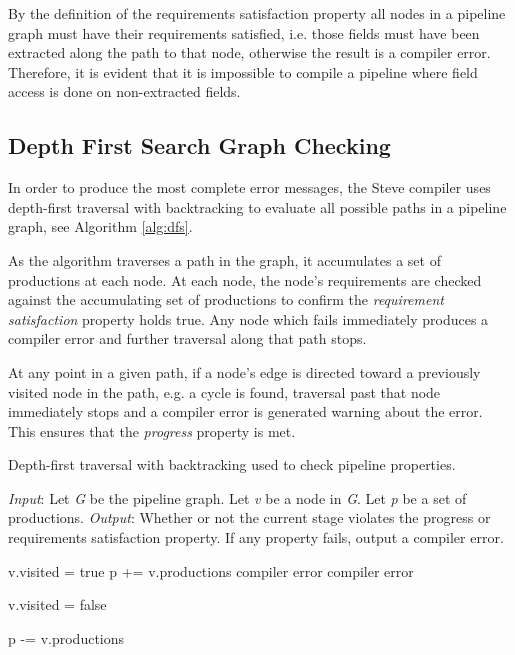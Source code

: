 By the definition of the requirements satisfaction property all nodes in a pipeline graph must have their requirements satisfied, i.e. those fields must have been extracted along the path to that node, otherwise the result is a compiler error. Therefore, it is evident that it is impossible to compile a pipeline where field access is done on non-extracted fields.

\subsection{Depth First Search Graph Checking} \label{guide:dfs_desc}

In order to produce the most complete error messages, the Steve compiler uses depth-first traversal with backtracking to evaluate all possible paths in a pipeline graph, see Algorithm \ref{alg:dfs}. 

As the algorithm traverses a path in the graph, it accumulates a set of productions at each node. At each node, the node's requirements are checked against the accumulating set of productions to confirm the \textit{requirement satisfaction} property holds true. Any node which fails immediately produces a compiler error and further traversal along that path stops.

At any point in a given path, if a node's edge is directed toward a previously visited node in the path, e.g. a cycle is found, traversal past that node immediately stops and a compiler error is generated warning about the error. This ensures that the \textit{progress} property is met.

\begin{algorithm}[ht]
 \caption{Depth-first traversal with backtracking used to check pipeline properties.}
 \label{alg:dfs}
 \begin{algorithmic}
 \State
 \State \textit{Input}: Let \textit{G} be the pipeline graph. Let \textit{v} be a node in \textit{G}. Let \textit{p} be a set of productions.
 \State \textit{Output}: Whether or not the current stage violates the progress or requirements satisfaction property. If any property fails, output a compiler error.
 \State

 	\State v.visited = true
 	\State p  += v.productions
 				\State {}
 			\Else
 				\State \Return compiler error
 			\EndIf
 		\EndFor
	\Else
 		\State \Return compiler error
 	\EndIf

 	\State v.visited = false 

 	\State p -= v.productions 
 \EndFunction
 \end{algorithmic}

\end{algorithm}

